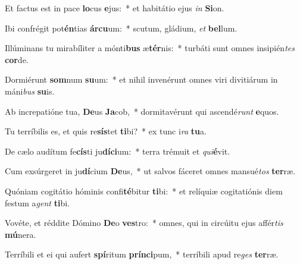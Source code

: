 \item Et factus est in pace \textbf{lo}cus \textbf{e}jus:~* et habitátio ejus \textit{in} \textbf{Si}on.
\item Ibi confrégit pot\textbf{én}tias \textbf{ár}\textbf{cu}um:~* scutum, gládium, \textit{et} \textbf{bel}lum.
\item Illúminans tu mirabíliter a mónti\textbf{bus} æ\textbf{tér}nis:~* turbáti sunt omnes insipién\textit{tes} \textbf{cor}de.
\item Dormiérunt \textbf{som}num \textbf{su}um:~* et nihil invenérunt omnes viri divitiárum in máni\textit{bus} \textbf{su}is.
\item Ab increpatióne tua, \textbf{De}us \textbf{Ja}cob,~* dormitavérunt qui ascendé\textit{runt} \textbf{e}quos.
\item Tu terríbilis es, et quis re\textbf{sís}tet \textbf{ti}bi?~* ex tunc i\textit{ra} \textbf{tu}a.
\item De cælo audítum fe\textbf{cís}ti ju\textbf{dí}\textbf{ci}um:~* terra trémuit et \textit{qui}\textbf{é}vit.
\item Cum exsúrgeret in ju\textbf{dí}cium \textbf{De}us,~* ut salvos fáceret omnes mansué\textit{tos} \textbf{ter}ræ.
\item Quóniam cogitátio hóminis confi\textbf{té}bitur \textbf{ti}bi:~* et relíquiæ cogitatiónis diem festum a\textit{gent} \textbf{ti}bi.
\item Vovéte, et réddite Dómino \textbf{De}o \textbf{ves}tro:~* omnes, qui in circúitu ejus affér\textit{tis} \textbf{mú}nera.
\item Terríbili et ei qui aufert \textbf{spí}ritum \textbf{prín}\textbf{ci}pum,~* terríbili apud re\textit{ges} \textbf{ter}ræ.

